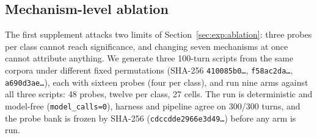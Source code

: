 \subsection{Mechanism-level ablation}\label{sec:exp:mech}

The first supplement attacks two limits of Section~\ref{sec:exp:ablation}: three
probes per class cannot reach significance, and changing seven mechanisms at
once cannot attribute anything. We generate three 100-turn scripts from the same
corpora under different fixed permutations (SHA-256
\texttt{410085b0\ldots}, \texttt{f58ac2da\ldots}, \texttt{a690d3ae\ldots}), each
with sixteen probes (four per class), and run nine arms against all three
scripts: 48 probes, twelve per class, 27 cells. The run is deterministic and
model-free (\texttt{model\_calls=0}), harness and pipeline agree on 300/300
turns, and the probe bank is frozen by SHA-256
(\texttt{cdccdde2966e3d49\ldots}) before any arm is run.

